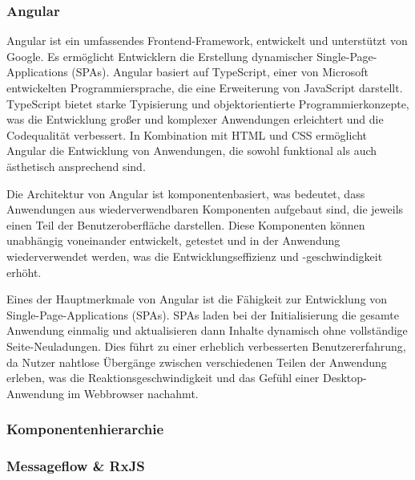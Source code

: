 \documentclass[../main.tex]{subfiles} %
\begin{document}
\subsubsection{Angular}

Angular ist ein umfassendes Frontend-Framework, entwickelt und unterstützt von Google. Es ermöglicht Entwicklern die Erstellung dynamischer
Single-Page-Applications (SPAs). Angular basiert auf TypeScript, einer von Microsoft entwickelten Programmiersprache, die eine Erweiterung
von JavaScript darstellt. TypeScript bietet starke Typisierung und objektorientierte Programmierkonzepte, was die Entwicklung großer und
komplexer Anwendungen erleichtert und die Codequalität verbessert. In Kombination mit HTML und CSS ermöglicht Angular die Entwicklung von
Anwendungen, die sowohl funktional als auch ästhetisch ansprechend sind.

Die Architektur von Angular ist komponentenbasiert, was bedeutet, dass Anwendungen aus wiederverwendbaren Komponenten aufgebaut sind, die
jeweils einen Teil der Benutzeroberfläche darstellen. Diese Komponenten können unabhängig voneinander entwickelt, getestet und in der
Anwendung wiederverwendet werden, was die Entwicklungseffizienz und -geschwindigkeit erhöht.

Eines der Hauptmerkmale von Angular ist die Fähigkeit zur Entwicklung von Single-Page-Applications (SPAs). SPAs laden bei der Initialisierung
die gesamte Anwendung einmalig und aktualisieren dann Inhalte dynamisch ohne vollständige Seite-Neuladungen. Dies führt zu einer erheblich
verbesserten Benutzererfahrung, da Nutzer nahtlose Übergänge zwischen verschiedenen Teilen der Anwendung erleben, was die Reaktionsgeschwindigkeit
und das Gefühl einer Desktop-Anwendung im Webbrowser nachahmt.

\subsubsection{Komponentenhierarchie}

\subsubsection{Messageflow \& RxJS}
\end{document}
